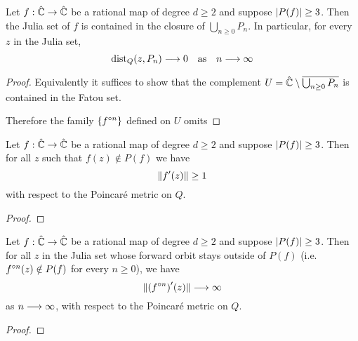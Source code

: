 \documentclass[../main.tex]{subfiles}
\newcommand\postcrit{P}
\newcommand\dist{\operatorname{dist}}
\newcommand\deriv[2]{{#1}'(#2)}
\begin{document}
\begin{lem}\label{lem:julia-in-cl-union}
Let $f : \hat{\mathbb{C}} \to \hat{\mathbb{C}}$ be a rational map of degree $d \ge 2$ and suppose $\abs{\postcrit(f)} \ge 3$. Then the Julia set of $f$ is contained in the closure of $\bigcup_{n \ge 0} P_n$. In particular, for every $z$ in the Julia set,
\[
\dist_Q(z,P_n) \tendsto 0 \quad\text{as}\quad n \tendsto \infty
\]
\end{lem}
\begin{proof}
Equivalently it suffices to show that the complement $U = \hat{\mathbb{C}}\setminus\overline{\bigcup_{n \ge 0} P_n}$ is contained in the Fatou set.

Therefore the family $\{f^{\circ n}\}$ defined on $U$ omits 
\end{proof}



\begin{thm}\label{11:thm:expansion-one}
Let $f : \hat{\mathbb{C}} \to \hat{\mathbb{C}}$ be a rational map of degree $d \ge 2$ and suppose $\abs{\postcrit(f)} \ge 3$. Then for all $z$ such that $f(z) \notin \postcrit(f)$ we have
\[
\norm{\deriv{f}{z}} \ge 1
\]
with respect to the Poincaré metric on $Q$.
\end{thm}
\begin{proof}

\end{proof}

\begin{thm}\label{11:thm:expansion-iter}
Let $f : \hat{\mathbb{C}} \to \hat{\mathbb{C}}$ be a rational map of degree $d \ge 2$ and suppose $\abs{\postcrit(f)} \ge 3$. Then for all $z$ in the Julia set whose forward orbit stays outside of $\postcrit(f)$ (i.e. $\iter{f}{n}(z) \notin \postcrit(f)$ for every $n \ge 0$), we have
\[
\norm{\deriv{(\iter{f}{n})}{z}} \tendsto \infty
\]
as $n \longrightarrow \infty$, with respect to the Poincaré metric on $Q$.
\end{thm}
\begin{proof}

\end{proof}
\end{document}
